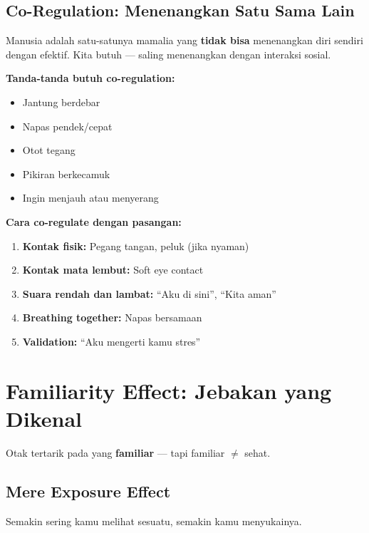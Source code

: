 \subsection{Co-Regulation: Menenangkan Satu Sama Lain}

\begin{insightbox}
Manusia adalah satu-satunya mamalia yang \textbf{tidak bisa} menenangkan diri sendiri dengan efektif. Kita butuh  --- saling menenangkan dengan interaksi sosial.
\end{insightbox}

\textbf{Tanda-tanda butuh co-regulation:}
\begin{itemize}
    \item Jantung berdebar
    \item Napas pendek/cepat
    \item Otot tegang
    \item Pikiran berkecamuk
    \item Ingin menjauh atau menyerang
\end{itemize}

\textbf{Cara co-regulate dengan pasangan:}
\begin{enumerate}
    \item \textbf{Kontak fisik:} Pegang tangan, peluk (jika nyaman)
    \item \textbf{Kontak mata lembut:} Soft eye contact
    \item \textbf{Suara rendah dan lambat:} ``Aku di sini'', ``Kita aman''
    \item \textbf{Breathing together:} Napas bersamaan
    \item \textbf{Validation:} ``Aku mengerti kamu stres''
\end{enumerate}

\section{Familiarity Effect: Jebakan yang Dikenal}

Otak tertarik pada yang \textbf{familiar} --- tapi familiar $\neq$ sehat.

\subsection{Mere Exposure Effect}

Semakin sering kamu melihat sesuatu, semakin kamu menyukainya.

